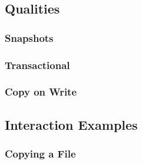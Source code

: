 \subsection{Qualities}

\subsubsection{Snapshots}

\subsubsection{Transactional}

\subsubsection{Copy on Write}

\subsection{Interaction Examples}

\subsubsection{Copying a File}


